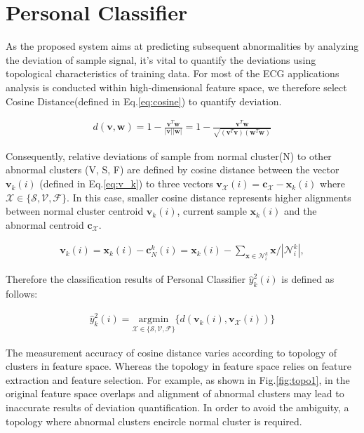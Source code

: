 \section{Personal Classifier}

As the proposed system aims at predicting subsequent abnormalities by analyzing the deviation of sample signal, it's vital to quantify the deviations using topological characteristics of training data. For most of the ECG applications analysis is conducted within high-dimensional feature space, we therefore select Cosine Distance(defined in Eq.\ref{eq:cosine}) to quantify deviation.

\begin{align}
\label{eq:cosine}
d(\mathbf{v},\mathbf{w})= 1 - \frac{\mathbf{v}^T\mathbf{w}}{|\mathbf{v}||\mathbf{w}|}=1 - \frac{\mathbf{v}^T\mathbf{w}}{\sqrt{(\mathbf{v}^T\mathbf{v})(\mathbf{w}^T\mathbf{w})}}
\end{align}

Consequently, relative deviations of sample from normal cluster(N) to other abnormal clusters (V, S, F) are defined by cosine distance between the vector $\mathbf{v}_k(i)$ (defined in Eq.\ref{eq:v_k}) to three vectors $\mathbf{v}_{\mathcal{X}}(i)=\mathbf{c}_{\mathcal{X}}-\mathbf{x}_k(i)$ where $\mathcal{X} \in \{ \mathcal{S}, \mathcal{V}, \mathcal{F}\}$. In this case, smaller cosine distance represents higher alignments between normal cluster centroid $\mathbf{v}_k(i)$, current sample $\mathbf{x}_k(i)$ and the abnormal centroid $\mathbf{c}_{\mathcal{X}}$.


\begin{align}
\label{eq:v_k}
\mathbf{v}_k(i)=\mathbf{x}_k(i)-\mathbf{c}_N^k(i) = \mathbf{x}_k(i)- {\sum_{\mathbf{x} \in \mathcal{N}_i^k} \mathbf{x}}/{|\mathcal{N}_i^k|}, 
\end{align}

Therefore the classification results of Personal Classifier $\hat{y}^2_k(i)$ is defined as follows:

\begin{align}
\label{eq:personal_discrim}
\hat{y}^2_k(i) = \underset{\mathcal{X} \in \{ \mathcal{S}, \mathcal{V}, \mathcal{F} \}}{\text{argmin}}\{ d(\mathbf{v}_k(i),\mathbf{v}_{\mathcal{X}}(i)) \} 
\end{align}

The measurement accuracy of cosine distance varies according to topology of clusters in feature space. Whereas the topology in feature space relies on feature extraction and feature selection. For example, as shown in Fig.\ref{fig:topo1}, in the original feature space overlaps and alignment of abnormal clusters may lead to inaccurate results of deviation quantification. In order to avoid the ambiguity, a topology where abnormal clusters encircle normal cluster is required.


